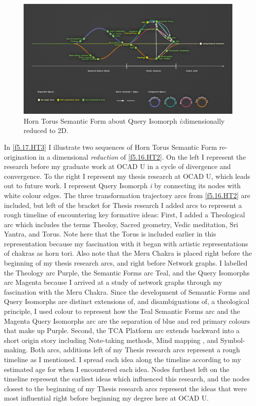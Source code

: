 \FloatBarrier  
\begin{figure}[h!]
    \centering
    \includegraphics[width=\textwidth]{figures/5.17.HT3.png}
    \caption[Horn Torus Semantic Form about Query Isomorph \textit{i}: dimensionally reduced to 2D]{Horn Torus Semantic Form about Query Isomorph \textit{i}:dimensionally reduced to 2D.}
    \label{f5.17.HT3}
\end{figure}
\FloatBarrier  

In \autoref{f5.17.HT3} I illustrate two sequences of Horn Torus Semantic Form re-origination in a dimensional \textit{reduction} of \autoref{f5.16.HT2}. On the left I represent the research before my graduate work at OCAD U in a cycle of divergence and convergence. To the right I represent my thesis research at OCAD U, which leads out to future work. I represent  Query Isomorph \textit{i} by connecting its nodes with white colour edges. The three transformation trajectory arcs from \autoref{f5.16.HT2} are included, but left of the bracket for Thesis research I added arcs to represent a rough timeline of encountering key formative ideas: First, I added a Theological arc which includes the terms Theoloy, Sacred geometry, Vedic meditation, Sri Yantra, and Torus. Note here that the Torus is included earlier in this representation because my fascination with it began with artistic representations of chakras as horn tori. Also note that the Meru Chakra is placed right before the beginning of my thesis research arcs, and right before Network graphs. I labelled the Theology arc Purple, the Semantic Forms arc Teal, and the Query Isomorphs arc Magenta because I arrived at a study of network graphs through my fascination with the Meru Chakra. Since the development of Semantic Forms and Query Isomorphs are distinct extensions of, and disambiguations of, a theological principle, I used colour to represent how the Teal Semantic Forms arc and the Magenta Query Isomorphs arc are the separation of blue and red primary colours that make up Purple. Second, the TCA Platform arc extends backward into a short origin story including Note-taking methods, Mind mapping  \citep{buzan_ultimate_2005}, and Symbol-making. Both arcs, additions left of my Thesis research arcs represent a rough timeline as I mentioned. I spread each idea along the timeline according to my estimated age for when I encountered each idea. Nodes furthest left on the timeline represent the earliest ideas which influenced this research, and the nodes closest to the beginning of my Thesis research arcs represent the ideas that were most influential right before beginning my degree here at OCAD U. 
